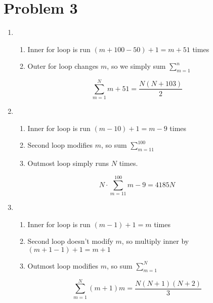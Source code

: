 \documentclass{article}
\begin{document}
\section*{Problem 3}
\begin{enumerate}[label=(\alph*)]
    \item \begin{enumerate}[label=\arabic*.]
        \item Inner for loop is run \((m + 100 - 50) + 1 = m + 51\) times
        \item Outer for loop changes \(m\), so we simply sum \(\sum_{m=1}^{n}\)
    \end{enumerate}
    \begin{equation*}
        \sum_{m=1}^{N}m+51 = \frac{N(N + 103)}{2}
    \end{equation*}
    \item \begin{enumerate}[label=\arabic*.]
        \item Inner for loop is run \((m - 10) + 1 = m - 9\) times
        \item Second loop modifies \(m\), so sum \(\sum_{m=11}^{100}\)
        \item Outmost loop simply runs \(N\) times.
    \end{enumerate}
    \begin{equation*}
        N\cdot\sum_{m=11}^{100}{m-9} = 4185N
    \end{equation*}
    \item \begin{enumerate}[label=\arabic*.]
        \item Inner for loop is run \((m - 1) + 1 = m\) times
        \item Second loop doesn't modify \(m\), so multiply inner by \((m + 1 - 1) + 1 = m + 1\)
        \item Outmost loop modifies \(m\), so sum \(\sum_{m=1}^{N}\)
    \end{enumerate}
    \begin{equation*}
        \sum_{m=1}^{N}{(m+1)m} = \frac{N(N+1)(N+2)}{3}
    \end{equation*}
\end{enumerate}
\end{document}
